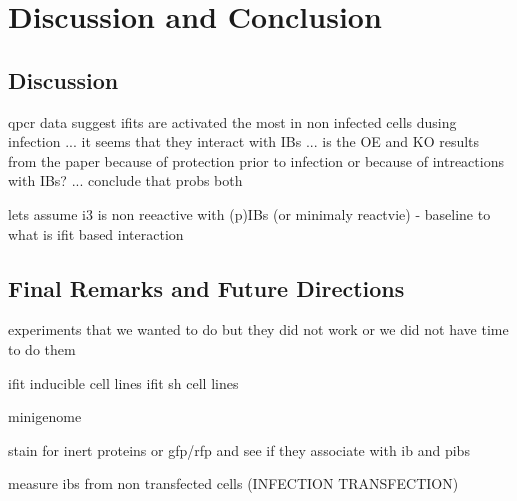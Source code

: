 \chapter{Discussion and Conclusion}
\section{Discussion}

qpcr data suggest ifits are activated the most in non infected cells dusing infection ... it seems that they interact with IBs ... is the OE and KO results from the paper because of protection prior to infection or because of intreactions with IBs? ... conclude that probs both


lets assume i3 is non reeactive with (p)IBs (or minimaly reactvie) - baseline to what is ifit based interaction

\section{Final Remarks and Future Directions}
experiments that we wanted to do but they did not work or we did not have time to do them

ifit inducible cell lines
ifit sh cell lines

minigenome

stain for inert proteins or gfp/rfp and see if they associate with ib and pibs

measure ibs from non transfected cells (INFECTION TRANSFECTION)



